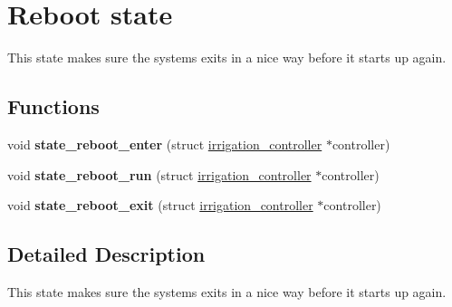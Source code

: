 \hypertarget{group__state__reboot}{}\section{Reboot state}
\label{group__state__reboot}


This state makes sure the systems exits in a nice way before it starts up again.  


\subsection*{Functions}
\begin{DoxyCompactItemize}
\item 
\hypertarget{group__state__reboot_gab0e3409fa69ff96792cb5a768928a545}{}void {\bfseries state\+\_\+reboot\+\_\+enter} (struct \hyperlink{structirrigation__controller}{irrigation\+\_\+controller} $\ast$controller)\label{group__state__reboot_gab0e3409fa69ff96792cb5a768928a545}

\item 
\hypertarget{group__state__reboot_ga23cf1ecfb670c7c6c253a40705aa5caf}{}void {\bfseries state\+\_\+reboot\+\_\+run} (struct \hyperlink{structirrigation__controller}{irrigation\+\_\+controller} $\ast$controller)\label{group__state__reboot_ga23cf1ecfb670c7c6c253a40705aa5caf}

\item 
\hypertarget{group__state__reboot_gafbcdeb4b017f4350fb6ff51df410228b}{}void {\bfseries state\+\_\+reboot\+\_\+exit} (struct \hyperlink{structirrigation__controller}{irrigation\+\_\+controller} $\ast$controller)\label{group__state__reboot_gafbcdeb4b017f4350fb6ff51df410228b}

\end{DoxyCompactItemize}


\subsection{Detailed Description}
This state makes sure the systems exits in a nice way before it starts up again. 


